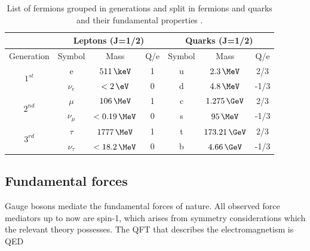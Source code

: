 \begin{table}[!htb]
\centering
\begin{tabular}{|c||c|c|c||c|c|c|}
\hline
 & \multicolumn{3}{c||}{Leptons (J=1/2)} & \multicolumn{3}{c|}{Quarks (J=1/2)} \\
\hline
Generation                &     Symbol &            Mass & Q/e & Symbol &           Mass & Q/e \\
\hline\hline
\multirow{2}{*}{$1^{st}$} & e          &     $511\,\keV$ &   1 &      u &    $2.3\,\MeV$ &  2/3 \\
                          & $\nu_e$    &     $< 2\, \eV$ &   0 &      d &    $4.8\,\MeV$ & -1/3 \\
\hline
\hline
\multirow{2}{*}{$2^{nd}$} & $\mu$      &  $   106\,\MeV$ &   1 &      c &  $1.275\,\GeV$ &  2/3 \\
                          & $\nu_\mu$  &  $< 0.19\,\MeV$ &   0 &      s &     $95\,\MeV$ & -1/3 \\
\hline
\hline
\multirow{2}{*}{$3^{rd}$} & $\tau$     & $   1777\,\MeV$ &   1 &      t & $173.21\,\GeV$ &  2/3 \\
                          & $\nu_\tau$ & $< 18.2 \,\MeV$ &   0 &      b &   $4.66\,\GeV$ & -1/3 \\
\hline
\end{tabular}
\caption[List of leptons and their fundamental properties]{List of fermions grouped in generations and split in fermions and quarks and their fundamental properties \cite{ARTICLE:PDG2014}.}
\label{TABLE:Theory_SM_ParticlesAndForces_MatterParticle}
\end{table}

\subsection{Fundamental forces}

Gauge bosons mediate the fundamental forces of nature. All observed force mediators up to now are spin-1, which arises from symmetry considerations which the relevant theory possesses. The \gls{QFT} that describes the electromagnetism is \gls{QED} 



